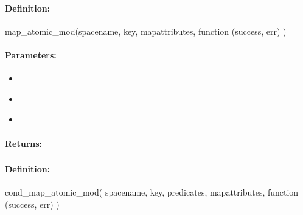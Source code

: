 \paragraph{Definition:}
\begin{javascriptcode}
map_atomic_mod(spacename, key, mapattributes, function (success, err) {})
\end{javascriptcode}
\paragraph{Parameters:}
\begin{itemize}[noitemsep]
\item {}\\

\item {}\\

\item {}\\

\end{itemize}

\paragraph{Returns:}


\pagebreak
\subsubsection{}
\label{api:nodejs:cond_map_atomic_mod}


\paragraph{Definition:}
\begin{javascriptcode}
cond_map_atomic_mod(
        spacename, key, predicates, mapattributes, function (success, err) {})
\end{javascriptcode}
